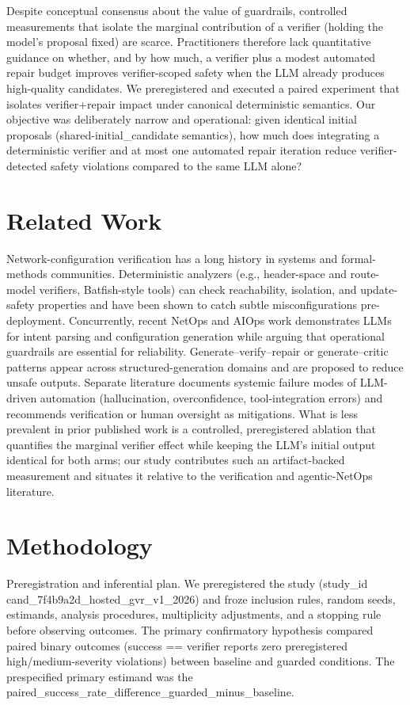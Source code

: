 \documentclass[conference]{IEEEtran}
\begin{document}
Despite conceptual consensus about the value of guardrails, controlled measurements that isolate the marginal contribution of a verifier (holding the model's proposal fixed) are scarce. Practitioners therefore lack quantitative guidance on whether, and by how much, a verifier plus a modest automated repair budget improves verifier-scoped safety when the LLM already produces high-quality candidates. We preregistered and executed a paired experiment that isolates verifier+repair impact under canonical deterministic semantics. Our objective was deliberately narrow and operational: given identical initial proposals (shared-initial\_candidate semantics), how much does integrating a deterministic verifier and at most one automated repair iteration reduce verifier-detected safety violations compared to the same LLM alone?

\section{Related Work}
Network-configuration verification has a long history in systems and formal-methods communities. Deterministic analyzers (e.g., header-space and route-model verifiers, Batfish-style tools) can check reachability, isolation, and update-safety properties and have been shown to catch subtle misconfigurations pre-deployment. Concurrently, recent NetOps and AIOps work demonstrates LLMs for intent parsing and configuration generation while arguing that operational guardrails are essential for reliability. Generate--verify--repair or generate--critic patterns appear across structured-generation domains and are proposed to reduce unsafe outputs. Separate literature documents systemic failure modes of LLM-driven automation (hallucination, overconfidence, tool-integration errors) and recommends verification or human oversight as mitigations. What is less prevalent in prior published work is a controlled, preregistered ablation that quantifies the marginal verifier effect while keeping the LLM's initial output identical for both arms; our study contributes such an artifact-backed measurement and situates it relative to the verification and agentic-NetOps literature.

\section{Methodology}
Preregistration and inferential plan. We preregistered the study (study\_id cand\_7f4b9a2d\_hosted\_gvr\_v1\_2026) and froze inclusion rules, random seeds, estimands, analysis procedures, multiplicity adjustments, and a stopping rule before observing outcomes. The primary confirmatory hypothesis compared paired binary outcomes (success == verifier reports zero preregistered high/medium-severity violations) between baseline and guarded conditions. The prespecified primary estimand was the paired\_success\_rate\_difference\_guarded\_minus\_baseline.
\end{document}
